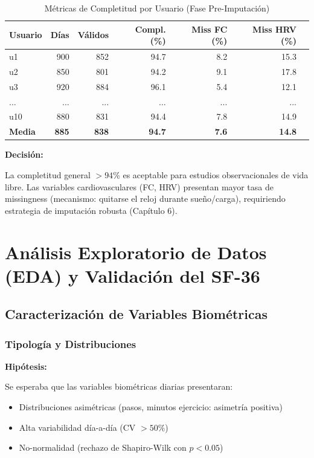 \documentclass[12pt,letterpaper,twoside]{report}
\begin{document}
\begin{table}[htbp]
\centering
\caption{Métricas de Completitud por Usuario (Fase Pre-Imputación)}
\label{tab:data_quality_raw}
\small
\begin{tabular}{lrrrrrr}
\toprule
\textbf{Usuario} & \textbf{Días} & \textbf{Válidos} & \textbf{Compl. (\%)} & \textbf{Miss FC (\%)} & \textbf{Miss HRV (\%)} \\
\midrule
u1  & 900 & 852 & 94.7 & 8.2 & 15.3 \\
u2  & 850 & 801 & 94.2 & 9.1 & 17.8 \\
u3  & 920 & 884 & 96.1 & 5.4 & 12.1 \\
... & ... & ... & ... & ... & ... \\
u10 & 880 & 831 & 94.4 & 7.8 & 14.9 \\
\midrule
\textbf{Media} & \textbf{885} & \textbf{838} & \textbf{94.7} & \textbf{7.6} & \textbf{14.8} \\
\bottomrule
\end{tabular}
\end{table}

\begin{decisionbox}
\textbf{Decisión:}

La completitud general $>94\%$ es aceptable para estudios observacionales de vida libre. Las variables cardiovasculares (FC, HRV) presentan mayor tasa de missingness (mecanismo: quitarse el reloj durante sueño/carga), requiriendo estrategia de imputación robusta (Capítulo 6).
\end{decisionbox}

\chapter{Análisis Exploratorio de Datos (EDA) y Validación del SF-36}

\section{Caracterización de Variables Biométricas}

\subsection{Tipología y Distribuciones}

\begin{hipotesisbox}
\textbf{Hipótesis:}

Se esperaba que las variables biométricas diarias presentaran:
\begin{itemize}[noitemsep]
    \item Distribuciones asimétricas (pasos, minutos ejercicio: asimetría positiva)
    \item Alta variabilidad día-a-día (CV $> 50\%$)
    \item No-normalidad (rechazo de Shapiro-Wilk con $p<0.05$)
\end{itemize}
\end{hipotesisbox}
\end{document}
